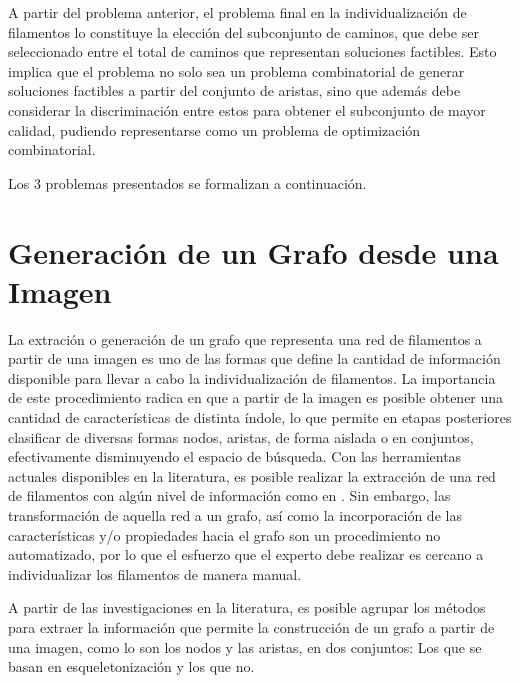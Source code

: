 A partir del problema anterior, el problema final en la individualizaci\'on de filamentos lo constituye la elecci\'on del subconjunto de caminos, que debe ser seleccionado entre el total de caminos que representan soluciones factibles. Esto implica que el problema no solo sea un problema combinatorial de generar soluciones factibles a partir del conjunto de aristas, sino que adem\'as debe considerar la discriminaci\'on entre estos para obtener el subconjunto de mayor calidad, pudiendo representarse como un problema de optimizaci\'on combinatorial.

Los 3 problemas presentados se formalizan a continuaci\'on.


\section{Generaci\'on de un Grafo desde una Imagen}
La extraci\'on o generaci\'on de un grafo que representa una red de filamentos a partir de una imagen es uno de las formas que define la cantidad de informaci\'on disponible para llevar a cabo la individualizaci\'on de filamentos. La importancia de este procedimiento radica en que a partir de la imagen es posible obtener una cantidad de caracter\'isticas de distinta \'indole, lo que permite en etapas posteriores clasificar de diversas formas nodos, aristas, de forma aislada o en conjuntos, efectivamente disminuyendo el espacio de b\'usqueda. Con las herramientas actuales disponibles en la literatura, es posible realizar la extracci\'on de una red de filamentos con algún nivel de informaci\'on como en \cite{xu2015soax}. Sin embargo, las transformaci\'on de aquella red a un grafo, as\'i como la incorporaci\'on de las caracter\'isticas y/o propiedades hacia el grafo son un procedimiento no automatizado, por lo que el esfuerzo que el experto debe realizar es cercano a individualizar los filamentos de manera manual.

A partir de las investigaciones en la literatura, es posible agrupar los m\'etodos para extraer la informaci\'on que permite la construcci\'on de un grafo a partir de una imagen, como lo son los nodos y las aristas, en dos conjuntos: Los que se basan en esqueletonizaci\'on\cite{lavado2018comparacion} y los que no. 

